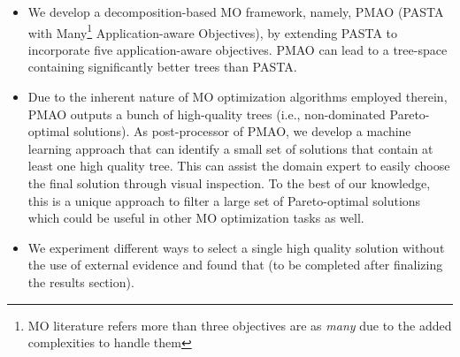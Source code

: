 \begin{itemize}
	\item We develop a decomposition-based MO framework, namely, PMAO (PASTA with Many\footnote{ MO literature refers more than three objectives are as \textit{many}\cite{li2015many} due to the added complexities to handle them} Application-aware Objectives), by extending PASTA to incorporate five application-aware objectives. PMAO can lead to a tree-space containing significantly better trees than PASTA. 

	\item Due to the inherent nature of MO optimization algorithms employed therein, PMAO outputs a bunch of high-quality trees (i.e., non-dominated Pareto-optimal solutions). As post-processor of PMAO, we develop a machine learning approach that can identify a small set of solutions that contain at least one high quality tree. This can assist the domain expert to easily choose the final solution through visual inspection. To the best of our knowledge, this is a unique approach to filter a large set of Pareto-optimal solutions which could be useful in other MO optimization tasks as well. 
	
	\item We experiment different ways to select a single high quality solution without the use of external evidence and found that (to be completed after finalizing the results section).

	
\end{itemize}

